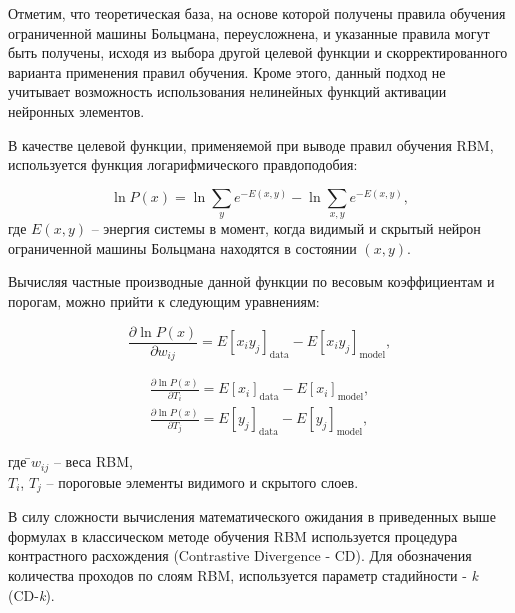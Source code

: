 \documentclass{thesisby}
\begin{document}
Отметим, что теоретическая база, на основе которой получены правила обучения ограниченной машины Больцмана, переусложнена, и указанные правила могут быть получены, исходя из выбора другой целевой функции и скорректированного варианта применения правил обучения. Кроме этого, данный подход не учитывает возможность использования нелинейных функций активации нейронных элементов.

В качестве целевой функции, применяемой при выводе правил обучения RBM, используется функция логарифмического правдоподобия:
 
\begin{equation*}
    \ln{P(x)} = \ln{\sum_y e^{-E(x, y)}} - \ln{\sum_{x,y} e^{-E(x, y)}},
\end{equation*}
где $E(x, y)$ -- энергия системы в момент, когда видимый и скрытый нейрон ограниченной машины Больцмана находятся в состоянии $(x, y)$.
	
Вычисляя частные производные данной функции по весовым коэффициентам и порогам, можно прийти к следующим уравнениям:

\begin{equation*}
    \label{grad_weights}
	\frac{\partial \ln P(x)}{\partial w_{ij}}=E\left[x_iy_j\right]_{\text{data}}-E\left[x_iy_j\right]_{\text{model}},
\end{equation*}
 
\begin{equation*}
\label{grad_biases}
\begin{aligned}
	\frac{\partial \ln P(x)}{\partial T_i}=E\left[x_i\right]_{\text{data}}-E\left[x_i\right]_{\text{model}},\\
	\frac{\partial \ln P(x)}{\partial T_j}=E\left[y_j\right]_{\text{data}}-E\left[y_j\right]_{\text{model}},
\end{aligned}
\end{equation*}
\begin{tabbing}
где \=$w_{ij}$ -- веса RBM,\\
\>$T_i$, $T_j$ -- пороговые элементы видимого и скрытого слоев.    
\end{tabbing}

В силу сложности вычисления математического ожидания в приведенных выше формулах в классическом методе обучения RBM используется процедура контрастного расхождения (Contrastive Divergence - CD). Для обозначения количества проходов по слоям RBM, используется параметр стадийности - \textit{k} (CD-\textit{k}).
\end{document}
